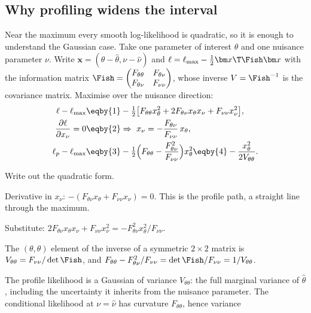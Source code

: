 \subsection{Why profiling widens the interval}
\label{3b:sec:profile-width}

Near the maximum every smooth log-likelihood is quadratic, so it is enough
to understand the Gaussian case. Take one parameter of interest $\theta$
and one nuisance parameter $\nu$. Write $\bm x=(\theta-\hat\theta,\nu-\hat\nu)$
and $\ell=\ell_{\max}-\tfrac12\bm x\T\Fish\bm x$ with the information matrix
$\Fish=\begin{pmatrix}F_{\theta\theta}&F_{\theta\nu}\\F_{\theta\nu}&F_{\nu\nu}\end{pmatrix}$,
whose inverse $V=\Fish^{-1}$ is the covariance matrix. Maximise over the
nuisance direction:
\begin{align}
  \ell-\ell_{\max}
  &\eqby{1}-\tfrac12\bigl[F_{\theta\theta}x_\theta^2+2F_{\theta\nu}x_\theta x_\nu+F_{\nu\nu}x_\nu^2\bigr],
  \nonumber\\
  \frac{\partial\ell}{\partial x_\nu}=0
  &\eqby{2}\Rightarrow\ x_\nu=-\frac{F_{\theta\nu}}{F_{\nu\nu}}\,x_\theta ,
  \nonumber\\
  \ell_p-\ell_{\max}
  &\eqby{3}-\tfrac12\Bigl(F_{\theta\theta}-\frac{F_{\theta\nu}^2}{F_{\nu\nu}}\Bigr)x_\theta^2
  \eqby{4}-\frac{x_\theta^2}{2V_{\theta\theta}} .
  \label{3b:eq:profile-gauss}
\end{align}
\begin{explain}
  \item Write out the quadratic form.
  \item Derivative in $x_\nu$: $-(F_{\theta\nu}x_\theta+F_{\nu\nu}x_\nu)=0$.
        This is the profile path, a straight line through the maximum.
  \item Substitute:
        $2F_{\theta\nu}x_\theta x_\nu+F_{\nu\nu}x_\nu^2=-F_{\theta\nu}^2x_\theta^2/F_{\nu\nu}$.
  \item The $(\theta,\theta)$ element of the inverse of a symmetric
        $2\times2$ matrix is
        $V_{\theta\theta}=F_{\nu\nu}/\det\Fish$, and
        $F_{\theta\theta}-F_{\theta\nu}^2/F_{\nu\nu}=\det\Fish/F_{\nu\nu}=1/V_{\theta\theta}$.
\end{explain}
The profile likelihood is a Gaussian of variance $V_{\theta\theta}$: the
full marginal variance of $\hat\theta$, including the uncertainty it
inherits from the nuisance parameter. The conditional likelihood at
$\nu=\hat\nu$ has curvature $F_{\theta\theta}$, hence variance
